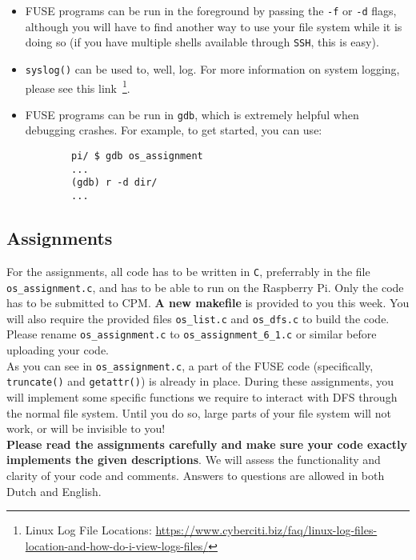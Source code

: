 \documentclass [a4,twoside,11pt] {article}
\begin{document}
    \begin{itemize}
        \item FUSE programs can be run in the foreground by passing the \texttt{-f} or \texttt{-d} flags, although you will have to find another way to use your file system while it is doing so (if you have multiple shells available through \texttt{SSH}, this is easy).
        \item \texttt{syslog()} can be used to, well, log. For more information on system logging, please see this link~\footnote{Linux Log File Locations: \url{https://www.cyberciti.biz/faq/linux-log-files-location-and-how-do-i-view-logs-files/}}.
        \item FUSE programs can be run in \texttt{gdb}, which is extremely helpful when debugging crashes. For example, to get started, you can use:
        \begin{verbatim}
        pi/ $ gdb os_assignment
        ...
        (gdb) r -d dir/
        ...\end{verbatim}
    \end{itemize}

    \newpage
    \subsection{Assignments}\label{assignments}

    For the assignments, all code has to be written in \texttt{C}, preferrably in the file \texttt{os\_assignment.c}, and has to be able to run on the Raspberry Pi. Only the code has to be submitted to CPM. \textbf{A new makefile} is provided to you this week. You will also require the provided files \texttt{os\_list.c} and \texttt{os\_dfs.c} to build the code. Please rename \texttt{os\_assignment.c} to \texttt{os\_assignment\_6\_1.c} or similar before uploading your code.\\

    As you can see in \texttt{os\_assignment.c}, a part of the FUSE code (specifically, \texttt{truncate()} and \texttt{getattr()}) is already in place. During these assignments, you will implement some specific functions we require to interact with DFS through the normal file system. Until you do so, large parts of your file system will not work, or will be invisible to you!\\

    \textbf{Please read the assignments carefully and make sure your code exactly implements the given descriptions}. We will assess the functionality and clarity of your code and comments. Answers to questions are allowed in both Dutch and English.\\
\end{document}
